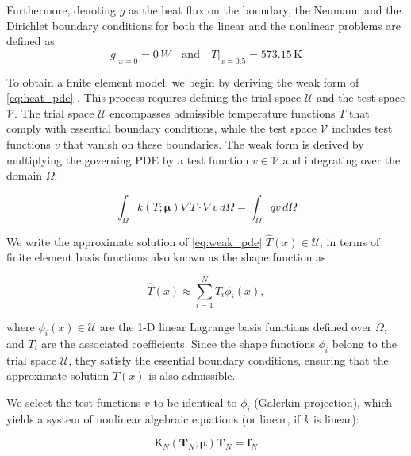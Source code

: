 \documentclass[11pt]{article}
\renewcommand{\vec}[1]{\mathbf{#1}}
\newcommand{\mat}[1]{\mathsf{#1}}
\begin{document}
Furthermore, denoting \( g \)  as the heat flux on the boundary, the Neumann and the Dirichlet boundary conditions for both the linear and the nonlinear problems are defined as
\begin{equation}
   \left. g\right|_{x = 0} = 0\, \unit{W} \quad \text{and} \quad \left.T\right|_{x = 0.5} = 573.15 \, \text{K} 
\end{equation}





To obtain a finite element model, we begin by deriving the weak form of \cref{eq:heat_pde} \cite{nreddy2018introduction,hughes2012finite}.
This process requires defining the trial space \( \mathcal{U} \) and the test space \( \mathcal{V} \).
The trial space \( \mathcal{U} \) encompasses admissible temperature functions \( T \) that comply with essential boundary conditions, while the test space \( \mathcal{V} \) includes test functions \( v \) that vanish on these boundaries.
The weak form is derived by multiplying the governing PDE by a test function \( v \in \mathcal{V} \) and integrating over the domain \( \Omega \):

\begin{equation}
\int_{\Omega} k(T;\boldsymbol\mu)\nabla T \cdot \nabla v \, d\Omega  = \int_{\Omega} q v \, d\Omega 
\label{eq:weak_pde}
\end{equation}


We write the approximate solution of \cref{eq:weak_pde} \( \widehat{T}(x) \in \mathcal{U} \), in terms of finite element basis functions also known as the shape function as

\begin{equation}
\widehat{T}(x) \approx \sum_{i=1}^{N} T_i \phi_i(x),
\label{eq:FE_shape}
\end{equation}

where \( \phi_i(x) \in \mathcal{U} \) are the 1-D linear Lagrange basis functions  defined over \( \Omega \), and \( T_i \) are the associated coefficients.
Since the shape functions \( \phi_i \) belong to the trial space \( \mathcal{U} \), they satisfy the essential boundary conditions, ensuring that the approximate solution \( T(x) \) is also admissible.

We select the test functions \( v \) to be identical to \( \phi_i \) (Galerkin projection), which yields a system of nonlinear algebraic equations (or linear, if \( k \) is linear):

\begin{equation}
\mat{K}_N(\vec{T}_N;\boldsymbol\mu) \vec{T}_N = \vec{f}_N
\label{eq:HC_HDM}
\end{equation}
\end{document}
